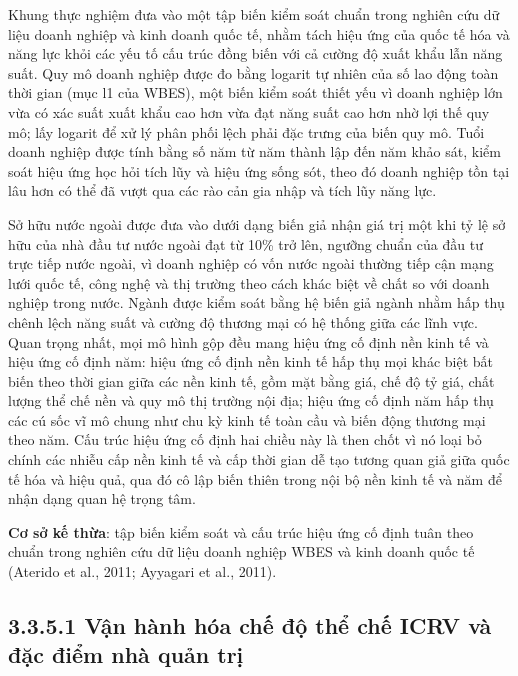 \documentclass[
  a4paper,
  13pt]{extreport}
\begin{document}
Khung thực nghiệm đưa vào một tập biến kiểm soát chuẩn trong nghiên cứu
dữ liệu doanh nghiệp và kinh doanh quốc tế, nhằm tách hiệu ứng của quốc
tế hóa và năng lực khỏi các yếu tố cấu trúc đồng biến với cả cường độ
xuất khẩu lẫn năng suất. Quy mô doanh nghiệp được đo bằng logarit tự
nhiên của số lao động toàn thời gian (mục l1 của WBES), một biến kiểm
soát thiết yếu vì doanh nghiệp lớn vừa có xác suất xuất khẩu cao hơn vừa
đạt năng suất cao hơn nhờ lợi thế quy mô; lấy logarit để xử lý phân phối
lệch phải đặc trưng của biến quy mô. Tuổi doanh nghiệp được tính bằng số
năm từ năm thành lập đến năm khảo sát, kiểm soát hiệu ứng học hỏi tích
lũy và hiệu ứng sống sót, theo đó doanh nghiệp tồn tại lâu hơn có thể đã
vượt qua các rào cản gia nhập và tích lũy năng lực.

Sở hữu nước ngoài được đưa vào dưới dạng biến giả nhận giá trị một khi
tỷ lệ sở hữu của nhà đầu tư nước ngoài đạt từ 10\% trở lên, ngưỡng chuẩn
của đầu tư trực tiếp nước ngoài, vì doanh nghiệp có vốn nước ngoài
thường tiếp cận mạng lưới quốc tế, công nghệ và thị trường theo cách
khác biệt về chất so với doanh nghiệp trong nước. Ngành được kiểm soát
bằng hệ biến giả ngành nhằm hấp thụ chênh lệch năng suất và cường độ
thương mại có hệ thống giữa các lĩnh vực. Quan trọng nhất, mọi mô hình
gộp đều mang hiệu ứng cố định nền kinh tế và hiệu ứng cố định năm: hiệu
ứng cố định nền kinh tế hấp thụ mọi khác biệt bất biến theo thời gian
giữa các nền kinh tế, gồm mặt bằng giá, chế độ tỷ giá, chất lượng thể
chế nền và quy mô thị trường nội địa; hiệu ứng cố định năm hấp thụ các
cú sốc vĩ mô chung như chu kỳ kinh tế toàn cầu và biến động thương mại
theo năm. Cấu trúc hiệu ứng cố định hai chiều này là then chốt vì nó
loại bỏ chính các nhiễu cấp nền kinh tế và cấp thời gian dễ tạo tương
quan giả giữa quốc tế hóa và hiệu quả, qua đó cô lập biến thiên trong
nội bộ nền kinh tế và năm để nhận dạng quan hệ trọng tâm.

\textbf{Cơ sở kế thừa}: tập biến kiểm soát và cấu trúc hiệu ứng cố định
tuân theo chuẩn trong nghiên cứu dữ liệu doanh nghiệp WBES và kinh doanh
quốc tế (Aterido et al., 2011; Ayyagari et al., 2011).

\hypertarget{vux1eadn-huxe0nh-huxf3a-chux1ebf-ux111ux1ed9-thux1ec3-chux1ebf-icrv-vuxe0-ux111ux1eb7c-ux111iux1ec3m-nhuxe0-quux1ea3n-trux1ecb}{%
\subsection{3.3.5.1 Vận hành hóa chế độ thể chế ICRV và đặc điểm nhà
quản
trị}\label{vux1eadn-huxe0nh-huxf3a-chux1ebf-ux111ux1ed9-thux1ec3-chux1ebf-icrv-vuxe0-ux111ux1eb7c-ux111iux1ec3m-nhuxe0-quux1ea3n-trux1ecb}}
\end{document}
